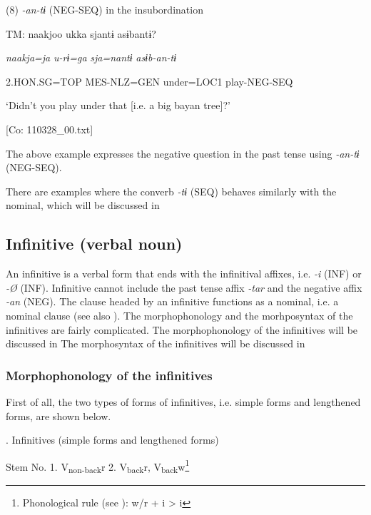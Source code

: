 (8)  \textit{{}-an-tɨ} (NEG-SEQ) in the insubordination

  TM:  naakjoo  ukka  sjantɨ  asɨbantɨ?

    \textit{naakja=ja}  \textit{u-rɨ=ga}  \textit{sja=nantɨ}  \textit{asɨb-an-tɨ}

    2.HON.SG=TOP  MES-NLZ=GEN  under=LOC1  play-NEG-SEQ

    ‘Didn’t you play under that [i.e. a big bayan tree]?’

    [Co: 110328\_00.txt]

The above example expresses the negative question in the past tense using \textit{{}-an-tɨ} (NEG-SEQ).

  There are examples where the converb \textit{{}-tɨ} (SEQ) behaves similarly with the nominal, which will be discussed in 

\subsection{Infinitive (verbal noun)}

An infinitive is a verbal form that ends with the infinitival affixes, i.e. \textit{{}-i} (INF) or \textit{{}-Ø} (INF). Infinitive cannot include the past tense affix \textit{{}-tar} and the negative affix \textit{{}-an} (NEG). The clause headed by an infinitive functions as a nominal, i.e. a nominal clause (see also ). The morphophonology and the morhposyntax of the infinitives are fairly complicated. The morphophonology of the infinitives will be discussed in  The morphosyntax of the infinitives will be discussed in 

\subsubsection{Morphophonology of the infinitives}

First of all, the two types of forms of infinitives, i.e. simple forms and lengthened forms, are shown below.

\begin{styleBeschriftung}
\textmd{. Infinitives (simple forms and lengthened forms)}
\end{styleBeschriftung}

Stem No.  1. V\textsubscript{non-back}r  2. V\textsubscript{back}r, V\textsubscript{back}w\footnote{Phonological rule (see ): w/r + i > i}

